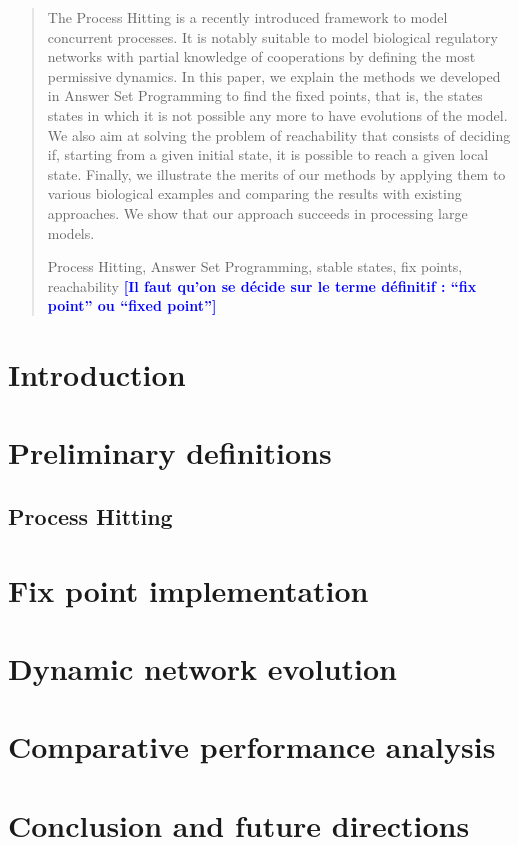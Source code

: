 \documentclass[runningheads,a4paper]{llncs}
\newcommand{\annotMF}[1]{\textcolor{blue}{\textbf{[#1]}}}
\newcounter{la}
\newcommand{\keywords}[1]{\par\addvspace\baselineskip
\noindent\keywordname\enspace\ignorespaces#1}
\begin{document}
\begin{abstract}
The Process Hitting is a recently introduced framework to model concurrent processes.
It is notably suitable to model biological regulatory networks with partial knowledge of
cooperations by defining the most permissive dynamics.
In this paper, we explain the methods we developed in Answer Set Programming
to find the fixed points, that is, the states states in which it is not possible
any more to have evolutions of the model.
We also aim at solving the problem of reachability that consists of deciding if,
starting from a given initial state, it is possible to reach a given local state.
Finally, we illustrate the merits of our methods by applying them to various
biological examples and comparing the results with existing approaches.
We show that our approach succeeds in processing large models.

\keywords{Process Hitting, Answer Set Programming, stable states, fix points, reachability}
\annotMF{Il faut qu'on se décide sur le terme définitif : “fix point” ou “fixed point”}
\end{abstract}


\section{Introduction}


\section{Preliminary definitions}

\subsection{Process Hitting }


\section{Fix point implementation}


\section{Dynamic network evolution }


\section{Comparative performance analysis}



\section{Conclusion and future directions}




\end{document}
